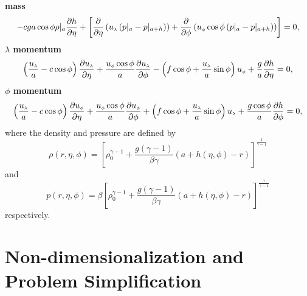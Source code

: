 {\bfseries mass}
\begin{equation}
-c g a \cos\phi \rho|_{a}{\frac{\partial h}{\partial \eta}}+\left[\frac{\partial}{\partial \eta} \left({u_{\scriptscriptstyle \lambda}}\left( p|_a-p|_{a+h}\right) \right) +\frac{\partial}{\partial \phi} \left({u_{\scriptscriptstyle \phi}}\cos\phi\left( p|_a-p|_{a+h}\right) \right)\right] =0, \label{eq:compmassp}
\end{equation}
{\bfseries \boldmath$\lambda$ momentum}
\begin{equation}
\left(\frac{{u_{\scriptscriptstyle \lambda}}}{a}-c\cos\phi\right){\frac{\partial {\ensuremath{u_{\scriptscriptstyle \lambda}}}}{\partial \eta}} + \frac{{u_{\scriptscriptstyle \phi}}\cos\phi}{a}{\frac{\partial {\ensuremath{u_{\scriptscriptstyle \lambda}}}}{\partial \phi}} - \left(f\cos\phi + \frac{{u_{\scriptscriptstyle \lambda}}}{a}\sin\phi \right){u_{\scriptscriptstyle \phi}} + \frac{g}{a}{\frac{\partial h}{\partial \eta}} = 0, \label{eq:lamcomp}
\end{equation}
{\bfseries \boldmath$\phi$ momentum}
\begin{equation}
\left(\frac{{u_{\scriptscriptstyle \lambda}}}{a}-c\cos\phi\right){\frac{\partial {\ensuremath{u_{\scriptscriptstyle \phi}}}}{\partial \eta}}+\frac{{u_{\scriptscriptstyle \phi}}\cos\phi}{a}{\frac{\partial {\ensuremath{u_{\scriptscriptstyle \phi}}}}{\partial \phi}}+\left(f\cos\phi+\frac{{u_{\scriptscriptstyle \lambda}}}{a}\sin\phi \right){u_{\scriptscriptstyle \lambda}}+\frac{g\cos\phi}{a}{\frac{\partial h}{\partial \phi}}=0, \label{eq:phicomp}
\end{equation}
where the density and pressure are defined by
\begin{equation}
\rho(r,\eta,\phi) =\left[\rho^{\gamma-1}_{\scriptscriptstyle 0}+\frac{g(\gamma-1)}{\beta \gamma} (a+h(\eta,\phi)-r) \right]^{\frac{1}{\gamma-1}} \label{eq:dencomp}
\end{equation}
and
\begin{equation}
p(r,\eta,\phi) = \beta\left[\rho^{\gamma-1}_{\scriptscriptstyle 0}+\frac{g(\gamma-1)}{\beta \gamma} (a+h(\eta,\phi)-r) \right]^{\frac{\gamma}{\gamma-1}} \label{eq:pcomp}
\end{equation}
respectively.

\section{Non-dimensionalization and Problem Simplification}
